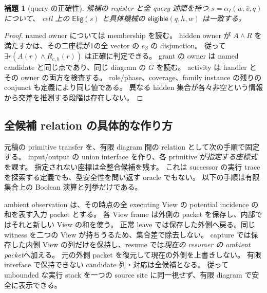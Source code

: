 \documentclass[11pt,a4paper]{article}
\newtheorem{lemma}[definition]{補題}
\begin{document}
\begin{lemma}[query の正確性]
候補の register と全 query 述語を持つ \(s=\alpha_I(w,\bar v,q)\) について、
cell 上の \(\mathsf{Elig}(s)\) と具体機械の \(\mathsf{eligible}(q,h,w)\) は一致する。
\end{lemma}
\begin{proof}
named owner については membership を読む。
hidden owner が \(A\land R\) を満たすかは、その二座標が1の全 vector の \(e_\beta\) の disjunction。
従って \(\exists r(A(r)\land R_{c,h}(r))\) は正確に判定できる。
grant の owner は named candidate と同じ点であり、同じ diagram の \(G\) を読む。
activity は handler とその owner の両方を検査する。
role/phase、coverage、family instance の残りの conjunct も定義により同じ値である。
異なる hidden 集合が各々非空という情報から交差を推測する段階は存在しない。
\end{proof}

\subsection{全候補 relation の具体的な作り方}

元稿の primitive transfer を、有限 diagram 間の relation として次の手順で固定する。
input/output の union interface を作り、各 primitive が\emph{指定する座標式}を課す。
指定されない座標は全整合候補を残す。
これは successor の実行 trace を探索する定義でも、型安全性を問い返す oracle でもない。
以下の手順は有限集合上の Boolean 演算と列挙だけである。

ambient observation は、その時点の全 executing View の potential incidence の和を表す入力 packet とする。
各 View frame は外側の packet を保存し、内部ではそれと新しい View の和を使う。
正常 leave では保存した外側へ戻る。同じ witness を二つの View が持ちうるため、集合差で除去しない。
capture では保存した内側 View の列だけを保持し、resume では\emph{現在の resumer の ambient packet}へ加える。
元の外側 packet を復元して現在の外側を上書きしない。
有限 interface で保持できない candidate 列・対応は全候補となる。
従って unbounded な実行 stack を一つの source site に同一視せず、有限 diagram で安全に表示できる。
\end{document}

